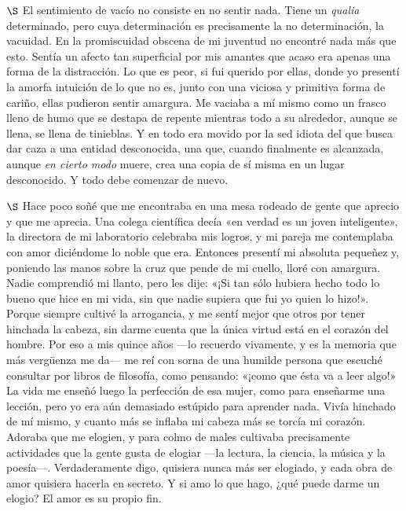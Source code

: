 \documentclass[a4paper, 12pt]{article}
\begin{document}
$\S$ El sentimiento de vacío no consiste en no sentir nada. Tiene un
\textit{qualia} determinado, pero cuya determinación es precisamente la no
determinación, la vacuidad. En la promiscuidad obscena de mi juventud no
encontré nada más que esto. Sentía un afecto tan superficial por mis amantes que
acaso era apenas una forma de la distracción. Lo que es peor, si fui querido por
ellas, donde yo presentí la amorfa intuición de lo que no es, junto con una
viciosa y primitiva forma de cariño, ellas pudieron sentir amargura. Me vaciaba
a mí mismo como un frasco lleno de humo que se destapa de repente mientras todo
a su alrededor, aunque se llena, se llena de tinieblas. Y en todo era movido por
la sed idiota del que busca dar caza a una entidad desconocida, una que, cuando
finalmente es alcanzada, aunque \textit{en cierto modo} muere, crea una copia de
sí misma en un lugar desconocido. Y todo debe comenzar de nuevo.

$\S$ Hace poco soñé que me encontraba en una mesa rodeado de gente que aprecio y
que me aprecia. Una colega científica decía «en verdad es un joven inteligente»,
la directora de mi laboratorio celebraba mis logros, y mi pareja me contemplaba
con amor diciéndome lo noble que era. Entonces presentí mi absoluta pequeñez y,
poniendo las manos sobre la cruz que pende de mi cuello, lloré con amargura.
Nadie comprendió mi llanto, pero les dije: «¡Si tan sólo hubiera hecho todo lo
bueno que hice en mi vida, sin que nadie supiera que fui yo quien lo
hizo!». Porque siempre cultivé la arrogancia, y me sentí mejor que
otros por tener hinchada la cabeza, sin darme cuenta que la única virtud está en
el corazón del hombre. Por eso a mis quince años ---lo recuerdo vivamente, y es
la memoria que más vergüenza me da--- me reí con sorna de una humilde persona
que escuché consultar por libros de filosofía, como pensando: «¡como que ésta va
a leer algo!» La vida me enseñó luego la perfección de esa mujer, como para
enseñarme una lección, pero yo era aún demasiado estúpido para aprender nada.
Vivía hinchado de mí mismo, y cuanto más se inflaba mi cabeza más se torcía mi
corazón. Adoraba que me elogien, y para colmo de males cultivaba precisamente
actividades que la gente gusta de elogiar ---la lectura, la ciencia, la música y
la poesía---. Verdaderamente digo, quisiera nunca más ser elogiado, y cada obra
de amor quisiera hacerla en secreto. Y si amo lo que hago, ¿qué puede darme un
elogio? El amor es su propio fin.
\end{document}
